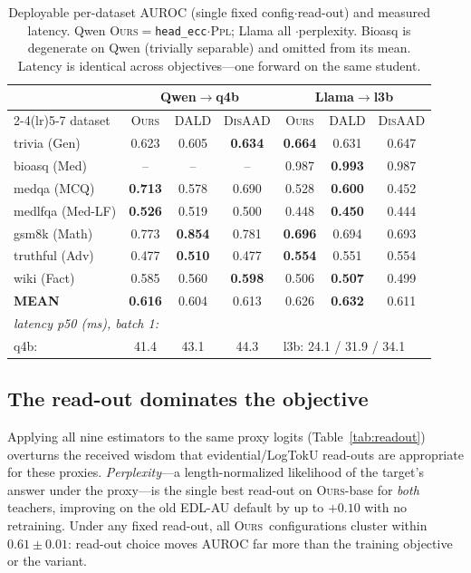 \documentclass[11pt]{article}
\newcommand{\ours}{\textsc{Ours}}
\newcommand{\dald}{\textsc{DALD}}
\newcommand{\disaad}{\textsc{DisAAD}}
\newcommand{\ppl}{\textsc{Ppl}}
\newcommand{\best}[1]{\textbf{#1}}
\begin{document}
\begin{table}[t]\centering\small
\setlength{\tabcolsep}{3pt}
\begin{tabular}{l ccc ccc}
\toprule
& \multicolumn{3}{c}{\textbf{Qwen}$\to$q4b} & \multicolumn{3}{c}{\textbf{Llama}$\to$l3b}\\
\cmidrule(lr){2-4}\cmidrule(lr){5-7}
dataset & \ours & \dald & \disaad & \ours & \dald & \disaad\\
\midrule
trivia (Gen)     & 0.623 & 0.605 & \best{0.634} & \best{0.664} & 0.631 & 0.647\\
bioasq (Med)     & --    & --    & --    & 0.987 & \best{0.993} & 0.987\\
medqa (MCQ)      & \best{0.713} & 0.578 & 0.690 & 0.528 & \best{0.600} & 0.452\\
medlfqa (Med-LF) & \best{0.526} & 0.519 & 0.500 & 0.448 & \best{0.450} & 0.444\\
gsm8k (Math)     & 0.773 & \best{0.854} & 0.781 & \best{0.696} & 0.694 & 0.693\\
truthful (Adv)   & 0.477 & \best{0.510} & 0.477 & \best{0.554} & 0.551 & 0.554\\
wiki (Fact)      & 0.585 & 0.560 & \best{0.598} & 0.506 & \best{0.507} & 0.499\\
\midrule
\textbf{MEAN}    & \best{0.616} & 0.604 & 0.613 & 0.626 & \best{0.632} & 0.611\\
\midrule
\multicolumn{7}{l}{\emph{latency p50 (ms), batch 1:}}\\
q4b: & 41.4 & 43.1 & 44.3 & \multicolumn{3}{l}{l3b: 24.1 / 31.9 / 34.1}\\
\bottomrule
\end{tabular}
\caption{Deployable per-dataset AUROC (single fixed config$\cdot$read-out) and measured
latency. Qwen \ours$=$\texttt{head\_ecc}$\cdot$\ppl; Llama all $\cdot$perplexity. Bioasq
is degenerate on Qwen (trivially separable) and omitted from its mean. Latency is
identical across objectives---one forward on the same student.}
\label{tab:perds}
\end{table}

\subsection{The read-out dominates the objective}\label{sec:readout}

Applying all nine estimators to the same proxy logits (Table~\ref{tab:readout})
overturns the received wisdom that evidential/LogTokU read-outs are appropriate for
these proxies. \emph{Perplexity}---a length-normalized likelihood of the target's
answer under the proxy---is the single best read-out on \ours-base for \emph{both}
teachers, improving on the old EDL-AU default by up to $+0.10$ with no retraining. Under
any fixed read-out, all \ours\ configurations cluster within $0.61\pm0.01$: read-out
choice moves AUROC far more than the training objective or the variant.
\end{document}
